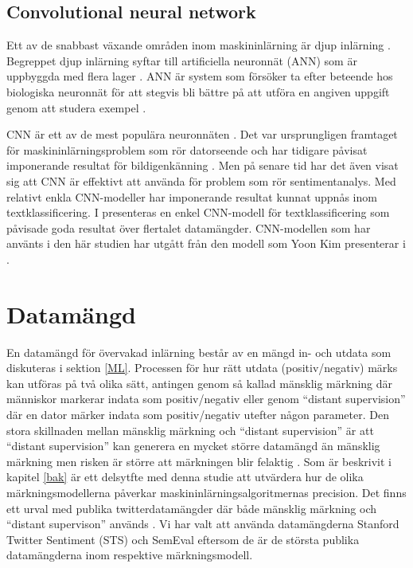 \documentclass{kaumasters} %
\begin{document}
\subsection{Convolutional neural network}\label{bak:cnn}
Ett av de snabbast växande områden inom maskininlärning är djup inlärning \cite{TSAsurvey}. Begreppet djup inlärning syftar till artificiella neuronnät (ANN) som är uppbyggda med flera lager  \cite{cnn:001}. ANN är system som försöker ta efter beteende hos biologiska neuronnät för att stegvis bli bättre på att utföra en angiven uppgift genom att studera exempel \cite{wiki:015}. 

CNN är ett av de mest populära neuronnäten  \cite{cnn:001}. Det var ursprungligen framtaget för maskininlärningsproblem som rör datorseende och har tidigare påvisat imponerande resultat för bildigenkänning \cite{cnn:003, cnn:006}. Men på senare tid har det även visat sig att CNN är effektivt att använda för problem som rör sentimentanalys. Med relativt enkla CNN-modeller har imponerande resultat kunnat uppnås inom textklassificering.  I \cite{cnn:003} presenteras en enkel CNN-modell för textklassificering som påvisade goda resultat över flertalet datamängder. CNN-modellen som har använts i den här studien har utgått från den modell som Yoon Kim presenterar i \cite{cnn:003}.

\section{Datamängd} \label{DS}
En datamängd för övervakad inlärning består av en mängd in- och utdata som diskuteras i sektion \ref{ML}. Processen för hur rätt utdata (positiv/negativ) märks kan utföras på två olika sätt, antingen genom så kallad mänsklig märkning där människor markerar indata som positiv/negativ eller genom “distant supervision” där en dator märker indata som positiv/negativ utefter någon parameter. Den stora skillnaden mellan mänsklig märkning och “distant supervision” är att “distant supervision” kan generera en mycket större datamängd än mänsklig märkning men risken är större att märkningen blir felaktig \cite{TSAsurvey}. 
Som är beskrivit i kapitel \ref{bak} är ett delsytfte med denna studie att utvärdera hur de olika märkningsmodellerna påverkar maskininlärningsalgoritmernas precision. Det finns ett urval med publika twitterdatamängder där både mänsklig märkning och “distant supervison” används \cite{TSAsurvey}. Vi har valt att använda datamängderna Stanford Twitter Sentiment (STS) \cite{sts:001} och SemEval \cite{SemEval:001} eftersom de är de största publika datamängderna inom respektive märkningsmodell.
\end{document}
